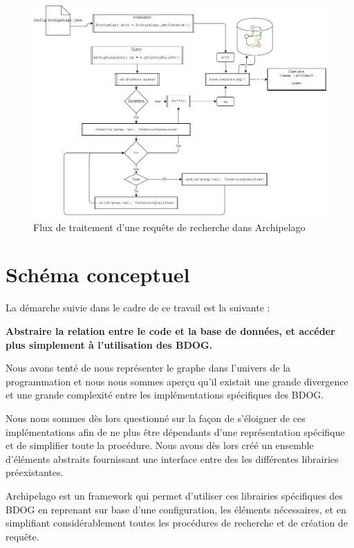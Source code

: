 \documentclass[a4paper,fleqn,12pt]{report}
\begin{document}
\begin{figure}[!ht]
\centering
\includegraphics[scale=0.5]{figures/query.png}
\caption{Flux de traitement d'une requête de recherche dans Archipelago}
\label{fig:Query}
\end{figure}



\section{Schéma conceptuel}

La démarche suivie dans le cadre de ce travail est la suivante :

\begin{center}
\textbf{Abstraire la relation entre le code et la base de données, et accéder plus simplement à l’utilisation des BDOG. }
\end{center} 

Nous avons tenté de nous représenter le graphe dans l'univers de la programmation et nous nous sommes aperçu qu'il existait une grande divergence et une grande complexité entre les implémentations spécifiques des BDOG.

Nous nous sommes dès lors questionné sur la façon de s'éloigner de ces implémentations afin de ne plus être dépendants d'une représentation spécifique et de simplifier toute la procédure. Nous avons dès lors créé un ensemble d'éléments abstraits fournissant une interface entre des les différentes librairies préexistantes.

Archipelago est un framework qui permet d'utiliser ces librairies spécifiques des BDOG en reprenant sur base d’une configuration, les éléments nécessaires, et en simplifiant considérablement toutes les procédures de recherche et de création de requête.
\end{document}
